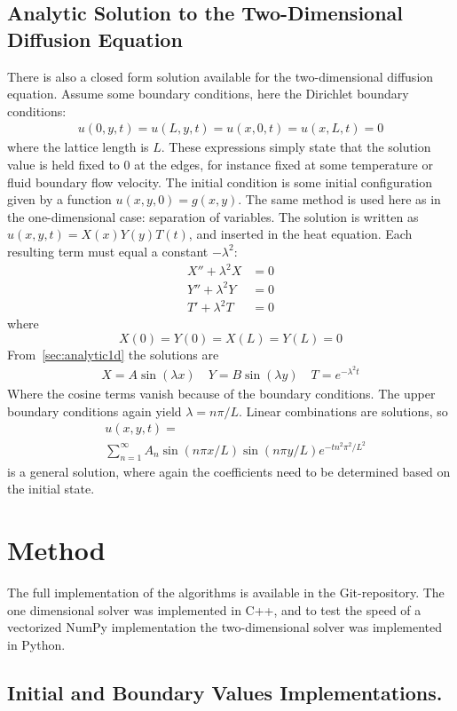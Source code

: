 \documentclass[aps,reprint]{revtex4-1}
\begin{document}
\subsection{Analytic Solution to the Two-Dimensional Diffusion Equation}
There is also a closed form solution available for the two-dimensional diffusion equation.
Assume some boundary conditions, here the Dirichlet boundary conditions:
\begin{align*}
  u(0, y, t) = u(L, y, t) = u(x, 0, t) = u(x, L, t) = 0
\end{align*}
where the lattice length is $L$. These expressions simply state that the solution
value is held fixed to $0$ at the edges, for instance fixed at some temperature or fluid
boundary flow velocity. The initial condition is some initial configuration given by a function $u(x,y,0) = g(x,y)$.
The same method is used here as in the one-dimensional case: separation of variables. The solution
is written as $u(x,y,t) = X(x) Y(y) T(t)$, and inserted in the heat equation. Each resulting
term must equal a constant $-\lambda^2$:
\begin{align*}
  X'' + \lambda^2 X &= 0 \\
  Y'' + \lambda^2 Y &= 0 \\
  T'  + \lambda^2 T &= 0
\end{align*}
where
\[X(0) = Y(0) = X(L) = Y(L) = 0\]
From~\ref{sec:analytic1d} the solutions are
\begin{align*}
  X = A \sin{(\lambda x)} \quad Y = B \sin{(\lambda y)} \quad T = e^{-\lambda^2 t}
\end{align*}
Where the cosine terms vanish because of the boundary conditions. The upper
boundary conditions again yield $\lambda = n \pi / L$. Linear combinations
are solutions, so
\begin{align*}
  &u(x,y,t) = \\&\sum_{n = 1}^{\infty} A_{n} \sin{(n \pi x / L)} \sin{(n \pi y / L)} e^{- t n^2 \pi^2 / L^2}
\end{align*}
is a general solution, where again the coefficients need to be determined based
on the initial state.
\section{Method} \label{sec:method}
The full implementation of the algorithms is available in the Git-repository.
The one dimensional solver was implemented in C++, and to test the speed of
a vectorized NumPy implementation the two-dimensional solver was implemented in Python.
\subsection{Initial and Boundary Values Implementations.}
\end{document}
